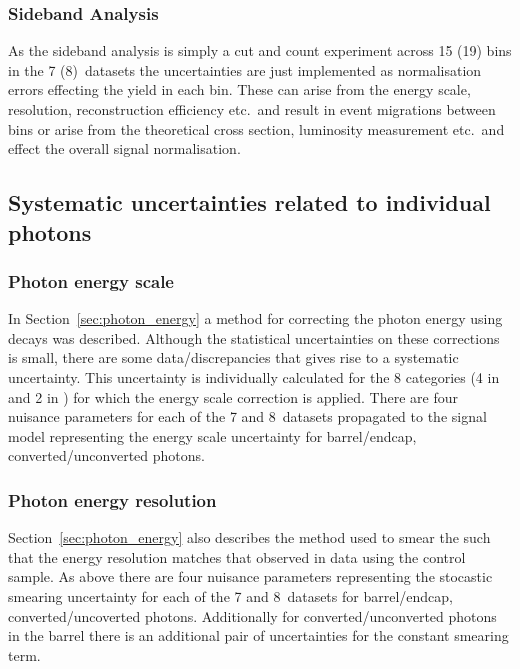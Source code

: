\subsubsection{Sideband Analysis}

As the sideband analysis is simply a cut and count experiment across 15 (19) bins in the 7 (8)~\TeV datasets the uncertainties are just implemented as normalisation errors effecting the yield in each bin. These can arise from the energy scale, resolution, reconstruction efficiency etc.~and result in event migrations between bins or arise from the theoretical cross section, luminosity measurement etc.~and effect the overall signal normalisation.

\subsection{Systematic uncertainties related to individual photons}

\subsubsection{Photon energy scale}
In Section~\ref{sec:photon_energy} a method for correcting the photon energy using \Zee decays was described. Although the statistical uncertainties on these corrections is small, there are some data/\MC discrepancies that gives rise to a systematic uncertainty. This uncertainty is individually calculated for the 8 categories (4 in \eta and 2 in \rnine) for which the energy scale correction is applied. There are four nuisance parameters for each of the 7 and 8~\TeV datasets propagated to the signal model representing the energy scale uncertainty for barrel/endcap, converted/unconverted photons.

\subsubsection{Photon energy resolution}
Section~\ref{sec:photon_energy} also describes the method used to smear the \MC such that the energy resolution matches that observed in data using the \Zee control sample. As above there are four nuisance parameters representing the stocastic smearing uncertainty for each of the 7 and 8~\TeV datasets for barrel/endcap, converted/uncoverted photons. Additionally for converted/unconverted photons in the barrel there is an additional pair of uncertainties for the constant smearing term.

